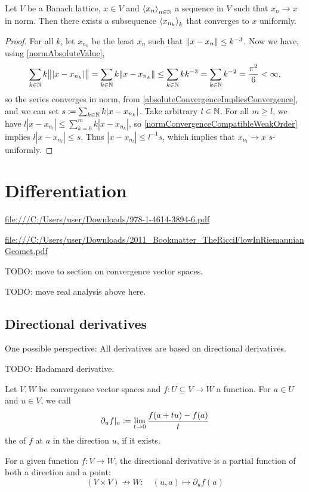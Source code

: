 \begin{proposition}
Let $V$ be a Banach lattice, $x\in V$ and $\seq{x_n}_{n\in\N}$ a sequence in $V$ such that $x_n\to x$ in norm. Then there exists a subsequence $\seq{x_{n_k}}_k$ that converges to $x$ uniformly.
\end{proposition}
\begin{proof}
For all $k$, let $x_{n_k}$ be the least $x_n$ such that $\norm{x-x_n} \leq k^{-3}$. Now we have, using \ref{normAbsoluteValue},
\[ \sum_{k\in \N} k\norm[\big]{|x-x_{n_k}|} = \sum_{k\in \N} k\norm{x-x_{n_k}} \leq \sum_{k\in \N} kk^{-3} = \sum_{k\in \N} k^{-2} = \frac{\pi^2}{6} < \infty, \]
so the series converges in norm, from \ref{absoluteConvergenceImpliesConvergence}, and we can set $s\defeq \sum_{k\in \N} k|x-x_{n_k}|$. Take arbitrary $l\in \N$. For all $m\geq l$, we have $l|x-x_{n_l}| \leq \sum_{k=0}^m k|x-x_{n_k}|$, so \ref{normConvergenceCompatibleWeakOrder} implies $l|x-x_{n_l}| \leq s$. Thus $|x-x_{n_l}| \leq l^{-1}s$, which implies that $x_{n_l} \to x$ $s$-uniformly.
\end{proof}

\chapter{Differentiation}
\url{file:///C:/Users/user/Downloads/978-1-4614-3894-6.pdf}

\url{file:///C:/Users/user/Downloads/2011_Bookmatter_TheRicciFlowInRiemannianGeomet.pdf}

TODO: move to section on convergence vector spaces.

TODO: move real analysis above here.


\section{Directional derivatives}
One possible perspective: All derivatives are based on directional derivatives.

TODO: Hadamard derivative.

\begin{definition}
Let $V,W$ be convergence vector spaces and $f:U\subseteq V\to W$ a function. For $a\in U$ and $u\in V$, we call
\[ \partial_u f|_a \defeq \lim_{t\to 0} \frac{f(a+tu) - f(a)}{t} \]
the  of $f$ at $a$ in the direction $u$, if it exists.
\end{definition}

For a given function $f:V\to W$, the directional derivative is a partial function of both a direction and a point:
\[ (V\times V) \not\to W:\quad (u,a) \mapsto \partial_u f(a)  \]

